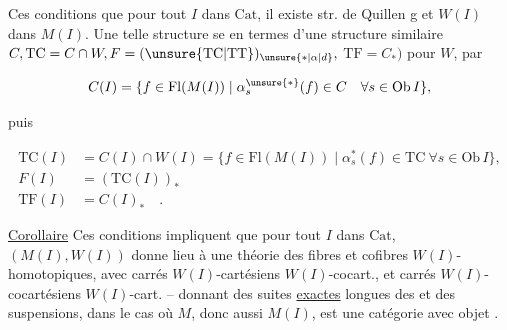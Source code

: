 
Ces conditions  que pour tout $I$ dans \uline{$\mathrm{Cat}$}, il existe  str. de Quillen    g et   $W(I)$ dans $M(I)$.  Une telle structure se  en termes d'une structure similaire $C,\mathrm{TC}=C\cap W,F=(\unsure{\mathrm{TC}|\mathrm{TT}})_{\unsure{*|\alpha|d}},$ $\mathrm{TF}=C_*)$ pour $W$, par

\[ C(I)=\{f\in\mathrm{Fl}(M(I))\mid\alpha_s^{\unsure{*}}(f)\in C\quad\forall s\in\mathrm{Ob}\,I\}, \]

puis

\[ \begin{aligned}
\mathrm{TC}(I)&=C(I)\cap W(I)=\{f\in\mathrm{Fl}(M(I))\mid\alpha_s^*(f)\in\mathrm{TC}\ \forall s\in\mathrm{Ob}\,I\},\\
F(I)&=(\mathrm{TC}(I))_*\\
\mathrm{TF}(I)&=C(I)_*\quad .
\end{aligned} \]

\uline{Corollaire} Ces conditions impliquent que pour tout  $I$ dans $\mathrm{Cat}$, $(M(I),W(I))$ donne lieu à une  théorie des fibres et cofibres $W(I)$-homotopiques, avec carrés $W(I)$-cartésiens  $W(I)$-cocart., et carrés $W(I)$-cocartésiens $W(I)$-cart. -- donnant des suites \uline{exactes} longues des  et des suspensions, dans le cas où $M$, donc aussi $M(I)$, est une catégorie avec objet .
